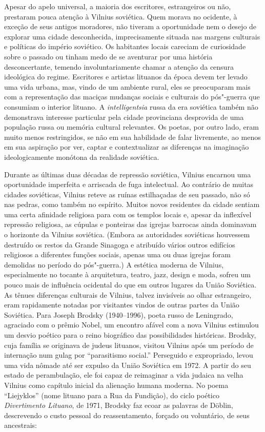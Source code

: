Apesar do apelo universal, a maioria dos escritores, estrangeiros ou
não, prestaram pouca atenção à Vilnius soviética. Quem morava no
ocidente, à exceção de seus antigos moradores, não tiveram a
oportunidade nem o desejo de explorar uma cidade desconhecida,
imprecisamente situada nas margens culturais e políticas do império
soviético. Os habitantes locais careciam de curiosidade sobre o passado
ou tinham medo de se aventurar por uma história desconcertante, temendo
involuntariamente chamar a atenção da censura ideológica do regime.
Escritores e artistas lituanos da época devem ter levado uma vida
urbana, mas, vindo de um ambiente rural, eles se preocuparam mais com a
representação das maciças mudanças sociais e culturais do pós"-guerra que
consumiam o interior lituano. A \emph{intelligentsia} russa da era
soviética também não demonstrava interesse particular pela cidade
provinciana desprovida de uma população russa ou memória cultural
relevantes. Os poetas, por outro lado, eram muito menos restringidos, se
não em sua habilidade de falar livremente, ao menos em sua aspiração por
ver, captar e contextualizar as diferenças na imaginação ideologicamente
monótona da realidade soviética.

Durante as últimas duas décadas de repressão soviética, Vilnius encarnou
uma oportunidade imperfeita e arriscada de fuga intelectual. Ao
contrário de muitas cidades soviéticas, Vilnius reteve as ruínas
estilhaçadas de seu passado, não só nas pedras, como também no espírito.
Muitos novos residentes da cidade sentiam uma certa afinidade religiosa
para com os templos locais e, apesar da inflexível repressão religiosa,
as cúpulas e ponteiras das igrejas barrocas ainda dominavam o horizonte
da Vilnius soviética. (Embora as autoridades soviéticas houvessem
destruído os restos da Grande Sinagoga e atribuído vários outros
edifícios religiosos a diferentes funções sociais, apenas uma ou duas
igrejas foram demolidas no período do pós"-guerra.) A estética moderna de
Vilnius, especialmente no tocante à arquitetura, teatro, jazz, design e
moda, sofreu um pouco mais de influência ocidental do que em outros
lugares da União Soviética. As tênues diferenças culturais de Vilnius,
talvez invisíveis ao olhar estrangeiro, eram rapidamente notadas por
visitantes vindos de outras partes da União Soviética. Para Joseph
Brodsky (1940--1996), poeta russo de Leningrado, agraciado com o prêmio
Nobel, um encontro afável com a nova Vilnius estimulou um desvio poético
para o reino biográfico das possibilidades históricas. Brodsky, cuja
família se originava de judeus lituanos, visitou Vilnius após um período
de internação num gulag por ``parasitismo social.'' Perseguido e
expropriado, levou uma vida nômade até ser expulso da União Soviética em
1972. A partir do seu estado de perambulação, ele foi capaz de
reimaginar a vida judaica na velha Vilnius como capítulo inicial da
alienação humana moderna. No poema ``Liejyklos'' (nome lituano para a
Rua da Fundição), do ciclo poético \emph{Divertimento Lituano}, de 1971,
Brodsky faz ecoar as palavras de Döblin, descrevendo o custo pessoal do
reassentamento, forçado ou voluntário, de seus ancestrais:

